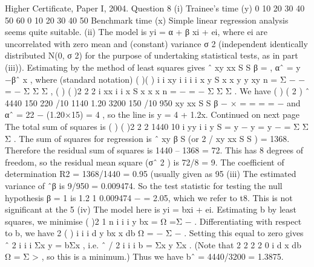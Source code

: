 Higher Certificate, Paper I, 2004. Question 8
(i)
Trainee's time (y)
0
10
20
30
40
50
60
0 10 20 30 40 50
Benchmark time (x)
Simple linear regression analysis seems quite suitable.
(ii) The model is yi = α + β xi + ei, where {ei} are uncorrelated with zero mean and
(constant) variance σ 2 (independent identically distributed N(0, σ 2) for the purpose of
undertaking statistical tests, as in part (iii)). Estimating by the method of least squares
gives
ˆ xy
xx
S
S
β = , αˆ = y −βˆ x ,
where (standard notation)
( )( ) i i
xy i i i i
x y
S x x y y xy
n
= Σ − − = − Σ Σ Σ ,
( ) ( )2
2 2 i
xx i i
x
S x x x
n
= − = − Σ Σ Σ .
We have
( )
( 2 )
ˆ 4440 150 220 /10 1140 1.20
3200 150 /10 950
xy
xx
S
S
β
− ×
= = = =
−
and αˆ = 22 − (1.20×15) = 4 ,
so the line is
y = 4 + 1.2x.
Continued on next page
The total sum of squares is ( ) ( )2
2 2 1440
10
i
yy i i
y
S = y − y = y − = Σ Σ Σ .
The sum of squares for regression is ˆ
xy β S (or 2 / xy xx S S ) = 1368.
Therefore the residual sum of squares is 1440 – 1368 = 72.
This has 8 degrees of freedom, so the residual mean square (σˆ 2 ) is 72/8 = 9.
The coefficient of determination R2 = 1368/1440 = 0.95 (usually given as 95%
(iii) The estimated variance of ˆβ is 9/950 = 0.009474. So the test statistic for
testing the null hypothesis β = 1 is 1.2 1
0.009474
− = 2.05, which we refer to t8.
This is not significant at the 5%
(iv) The model here is yi = bxi + ei.
Estimating b by least squares, we minimise ( )2
1
n
i i
i
y bx
=
Ω =Σ − .
Differentiating with respect to b, we have 2 ( ) i i i
d y bx x
db
Ω = − Σ − .
Setting this equal to zero gives ˆ 2
i i i Σx y = bΣx , i.e. ˆ / 2 i i i b = Σx y Σx .
(Note that
2
2
2 2 0 i
d x
db
Ω = Σ > , so this is a minimum.)
Thus we have bˆ = 4440/3200 = 1.3875.


